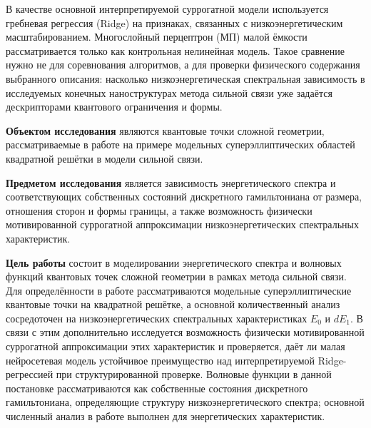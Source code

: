 В качестве основной интерпретируемой суррогатной модели используется гребневая регрессия
(Ridge) на признаках, связанных с низкоэнергетическим масштабированием. Многослойный
перцептрон (МП) малой ёмкости рассматривается только как контрольная нелинейная модель.
Такое сравнение нужно не для соревнования алгоритмов, а для проверки физического
содержания выбранного описания: насколько низкоэнергетическая спектральная зависимость в
исследуемых конечных наноструктурах метода сильной связи уже задаётся дескрипторами
квантового ограничения и формы.

\textbf{Объектом исследования} являются квантовые точки сложной геометрии, рассматриваемые
в работе на примере модельных суперэллиптических областей квадратной решётки в модели
сильной связи.

\textbf{Предметом исследования} является зависимость энергетического спектра и
соответствующих собственных состояний дискретного гамильтониана от размера, отношения
сторон и формы границы, а также возможность физически мотивированной суррогатной
аппроксимации низкоэнергетических спектральных характеристик.

\textbf{Цель работы} состоит в моделировании энергетического спектра и волновых функций
квантовых точек сложной геометрии в рамках метода сильной связи. Для определённости в
работе рассматриваются модельные суперэллиптические квантовые точки на квадратной решётке,
а основной количественный анализ сосредоточен на низкоэнергетических спектральных
характеристиках $E_0$ и $dE_1$. В связи с этим дополнительно исследуется возможность
физически мотивированной суррогатной аппроксимации этих характеристик и проверяется, даёт
ли малая нейросетевая модель устойчивое преимущество над интерпретируемой Ridge-регрессией
при структурированной проверке. Волновые функции в данной постановке рассматриваются как
собственные состояния дискретного гамильтониана, определяющие структуру
низкоэнергетического спектра; основной численный анализ в работе выполнен для
энергетических характеристик.

